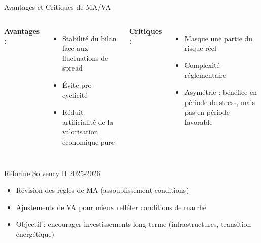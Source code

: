 \documentclass[10pt,aspectratio=169,xcolor={dvipsnames}]{beamer}
\begin{document}
\begin{frame}{Avantages et Critiques de MA/VA}
\begin{columns}
\textbf{Avantages :}
\begin{itemize}
    \item[\checkmark] Stabilité du bilan face aux fluctuations de spread
    \item[\checkmark] Évite pro-cyclicité
    \item[\checkmark] Réduit artificialité de la valorisation économique pure
\end{itemize}

\textbf{Critiques :}
\begin{itemize}
    \item[\texttimes] Masque une partie du risque réel
    \item[\texttimes] Complexité réglementaire
    \item[\texttimes] Asymétrie : bénéfice en période de stress, mais pas en période favorable
\end{itemize}
\end{columns}

\vspace{0.3cm}
\begin{alertblock}{Réforme Solvency II 2025-2026}
\begin{itemize}
    \item Révision des règles de MA (assouplissement conditions)
    \item Ajustements de VA pour mieux refléter conditions de marché
    \item Objectif : encourager investissements long terme (infrastructures, transition énergétique)
\end{itemize}
\end{alertblock}
\end{frame}
\end{document}
